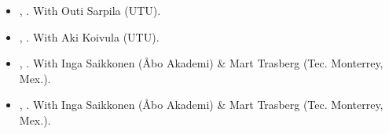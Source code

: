 \begin{itemize}


  	\item[\textcolor{gray}{\textbullet}] \href{https://raw.githubusercontent.com/hbahamonde/Physical/main/abstract.txt}{\unskip}, {\bf \emph{\unskip}}. With Outi Sarpila (UTU).

  	 \item[\textcolor{gray}{\textbullet}] \href{https://raw.githubusercontent.com/hbahamonde/Users/hectorbahamonde/research/Inequality_Populism_Finland/main/abstract.txt}{\unskip}, {\bf \emph{\unskip}}. With Aki Koivula (UTU).

 	\item[\textcolor{gray}{\textbullet}] \href{https://raw.githubusercontent.com/hbahamonde/Users/hectorbahamonde/research/democratic_backsliding/Paper_1/main/abstract.txt}{\unskip}, {\bf \emph{\unskip}}. With Inga Saikkonen (\AA bo Akademi) \& Mart Trasberg (Tec. Monterrey, Mex.).

 	\item[\textcolor{gray}{\textbullet}] \href{https://raw.githubusercontent.com/hbahamonde/Users/hectorbahamonde/research/democratic_backsliding/Paper_2/main/abstract.txt}{\unskip}, {\bf \emph{\unskip}}. With Inga Saikkonen (\AA bo Akademi) \& Mart Trasberg (Tec. Monterrey, Mex.).






\end{itemize}
